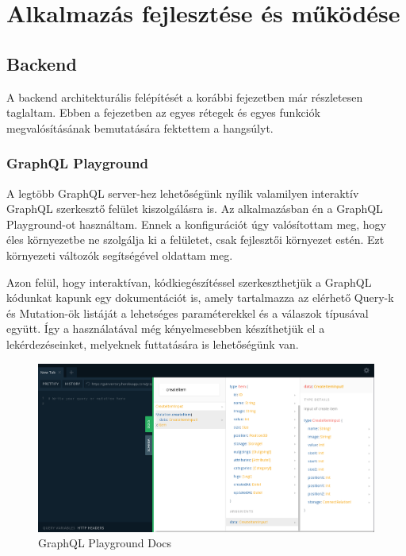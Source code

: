 \chapter{Alkalmazás fejlesztése és működése}

\section{Backend}
A backend architekturális felépítését a korábbi fejezetben már részletesen taglaltam.  
Ebben a fejezetben az egyes rétegek és egyes funkciók megvalósításának bemutatására fektettem a hangsúlyt.

\subsection{GraphQL Playground}
A legtöbb GraphQL server-hez lehetőségünk nyílik valamilyen interaktív GraphQL szerkesztő felület kiszolgálásra is.
Az alkalmazásban én a GraphQL Playground-ot használtam. Ennek a konfigurációt úgy valósítottam meg, hogy éles környezetbe ne szolgálja ki a felületet, csak fejlesztői környezet estén.
Ezt környezeti változók segítségével oldattam meg.

Azon felül, hogy interaktívan, kódkiegészítéssel szerkeszthetjük a GraphQL kódunkat kapunk egy dokumentációt is, amely tartalmazza az elérhető Query-k és Mutation-ök listáját a lehetséges paraméterekkel és a válaszok típusával együtt.
Így a használatával még kényelmesebben készíthetjük el a lekérdezéseinket, melyeknek futtatására is lehetőségünk van.

\begin{figure}[!ht]
  \centering
  \includegraphics[width=150mm, keepaspectratio]{figures/playground_docs.png}
  \caption{GraphQL Playground Docs}
  \label{fig:playgroundDocs}
\end{figure}

